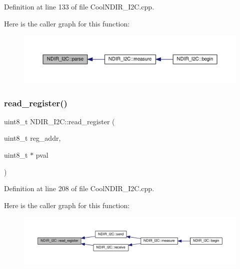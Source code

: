 Definition at line 133 of file Cool\+N\+D\+I\+R\+\_\+\+I2\+C.\+cpp.

Here is the caller graph for this function\+:\nopagebreak
\begin{figure}[H]
\begin{center}
\leavevmode
\includegraphics[width=350pt]{class_n_d_i_r___i2_c_a907b756fc9244c7398b7d187b73cde94_icgraph}
\end{center}
\end{figure}
\mbox{\label{class_n_d_i_r___i2_c_aa72058e6e7c6174b14466fee4b2df1e0}} 
\subsubsection{\texorpdfstring{read\+\_\+register()}{read\_register()}}
{\footnotesize\ttfamily uint8\+\_\+t N\+D\+I\+R\+\_\+\+I2\+C\+::read\+\_\+register (\begin{DoxyParamCaption}\item[{uint8\+\_\+t}]{reg\+\_\+addr,  }\item[{uint8\+\_\+t $\ast$}]{pval }\end{DoxyParamCaption})\hspace{0.3cm}{\ttfamily [private]}}



Definition at line 208 of file Cool\+N\+D\+I\+R\+\_\+\+I2\+C.\+cpp.

Here is the caller graph for this function\+:\nopagebreak
\begin{figure}[H]
\begin{center}
\leavevmode
\includegraphics[width=350pt]{class_n_d_i_r___i2_c_aa72058e6e7c6174b14466fee4b2df1e0_icgraph}
\end{center}
\end{figure}
\mbox{\label{class_n_d_i_r___i2_c_aa6d2b8dd287f9c9015461cebb18f9abc}} 
